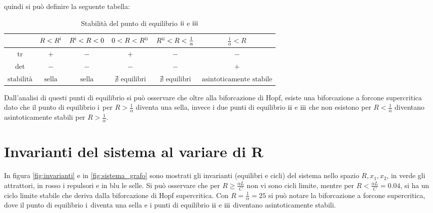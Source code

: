 \documentclass{article}
\newcommand{\rom}[1]{\uppercase\expandafter{\romannumeral #1\relax}}
\begin{document}
quindi si può definire la seguente tabella:

\begin{table}[h!]
    \centering
    \begin{tabular}{|c|c|c|c|c|c|}
        \hline
        $ $                & $R < R^\text{\rom{1}}$ & $R^\text{\rom{1}} < R < 0$ & $0 < R < R^\text{\rom{2}}$  & $R^\text{\rom{2}} < R < \frac{1}{\alpha}$ & $\frac{1}{\alpha} < R$           \\ \hline
        $\text{tr}$        & $+$                    & $-$                        & $+$                         & $-$                                       & $-$                              \\ \hline
        $\det$             & $-$                    & $-$                        & $-$                         & $-$                                       & $+$                              \\ \hline
        $\text{stabilità}$ & $\text{sella}$         & $\text{sella}$             & $\nexists\text{ equilibri}$ & $\nexists\text{ equilibri}$               & $\text{asintoticamente stabile}$ \\ \hline
    \end{tabular}
    \caption{Stabilità del punto di equilibrio \(\text{\rom{2}}\) e \(\text{\rom{3}}\)}
\end{table}

Dall'analisi di questi punti di equilibrio si può osservare che oltre alla biforcazione di Hopf, esiste una biforcazione a forcone supercritica dato che il punto di equilibrio \(\text{\rom{1}}\) per \(R > \frac{1}{\alpha}\) diventa una sella, invece i due punti di equilibrio \(\text{\rom{2}}\) e \(\text{\rom{3}}\) che non esistono per \(R < \frac{1}{\alpha}\) diventano asintoticamente stabili per \(R > \frac{1}{\alpha}\).

\section{Invarianti del sistema al variare di R}

In figura \ref{fig:invarianti} e in \ref{fig:sistema_grafo} sono mostrati gli invarianti (equilibri e cicli) del sistema nello spazio \(R, x_1, x_2\), in verde gli attrattori, in rosso i repulsori e in blu le selle. Si può osservare che per \(R \geq \frac{\alpha L}{C}\) non vi sono cicli limite, mentre per \(R < \frac{\alpha L}{C} = 0.04 \), si ha un ciclo limite stabile che deriva dalla biforcazione di Hopf supercritica. Con \(R = \frac{1}{\alpha} = 25\) si può notare la biforcazione a forcone supercritica, dove il punto di equilibrio \(\text{\rom{1}}\) diventa una sella e i punti di equilibrio \(\text{\rom{2}}\) e \(\text{\rom{3}}\) diventano asintoticamente stabili.
\end{document}
